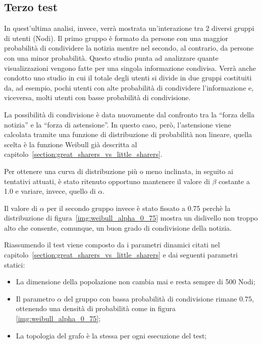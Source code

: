 \subsection{Terzo test}
\label{section:third_test}

In quest'ultima analisi, invece, verrà mostrata un'interazione tra 2 diversi gruppi di utenti (Nodi).
Il primo gruppo è formato da persone con una maggior probabilità di condividere la notizia 
mentre nel secondo, al contrario, da persone con una minor probabilità.
Questo studio punta ad analizzare quante visualizzazioni vengono fatte per una singola informazione condivisa.
Verrà anche condotto uno studio in cui il totale degli utenti si divide in due gruppi costituiti da, ad esempio, 
pochi utenti con alte probabilità di condividere l'informazione e, viceversa, 
molti utenti con basse probabilità di condivisione.

La possibilità di condivisione è data nuovamente dal confronto tra la ``forza della notizia'' e la ``forza di astensione''. 
In questo caso, però, l'astensione viene calcolata tramite una funzione di distribuzione di probabilità non lineare,
quella scelta è la funzione Weibull già descritta al capitolo~\ref{section:great_sharers_vs_little_sharers}.

Per ottenere una curva di distribuzione più o meno inclinata, in seguito ai tentativi attuati, 
è stato ritenuto opportuno mantenere il valore di $\beta$ costante a 1.0 e variare, invece, quello di $\alpha$.

Il valore di $\alpha$ per il secondo gruppo invece è stato fissato a 0.75 perchè 
la distribuzione di figura~\ref{img:weibull_alpha_0_75} mostra un dislivello non troppo 
alto che consente, comunque, un buon grado di condivisione della notizia.

Riassumendo il test viene composto da i parametri dinamici citati nel 
capitolo~\ref{section:great_sharers_vs_little_sharers} e dai seguenti parametri statici:
\begin{itemize}
\item La dimensione della popolazione non cambia mai e resta sempre di 500 Nodi;
\item Il parametro $\alpha$ del gruppo con bassa probabilità di condivisione rimane $0.75$, 
ottenendo una densità di probabilità come in figura \ref{img:weibull_alpha_0_75};
\item La topologia del grafo è la stessa per ogni esecuzione del test;
\end{itemize}


